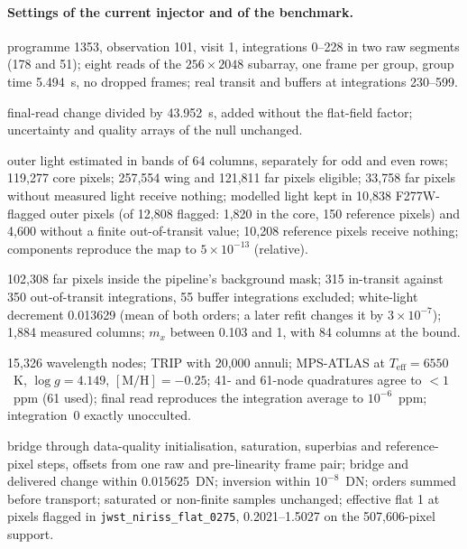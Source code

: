 \paragraph{Settings of the current injector and of the benchmark.}\label{tab:injector-settings}
{\footnotesize
\begin{description}[font=\normalfont\itshape,leftmargin=0pt,itemsep=0pt,topsep=2pt]
  \item[Baseline.] programme 1353, observation 101, visit 1, integrations 0--228 in two raw segments (178 and 51); eight reads of the $256\times2048$ subarray, one frame per group, group time 5.494~s, no dropped frames; real transit and buffers at integrations 230--599.
  \item[Rate-level control.] final-read change divided by 43.952~s, added without the flat-field factor; uncertainty and quality arrays of the null unchanged.
  \item[Source zones.] outer light estimated in bands of 64 columns, separately for odd and even rows; 119{,}277 core pixels; 257{,}554 wing and 121{,}811 far pixels eligible; 33{,}758 far pixels without measured light receive nothing; modelled light kept in 10{,}838 F277W-flagged outer pixels (of 12{,}808 flagged: 1{,}820 in the core, 150 reference pixels) and 4{,}600 without a finite out-of-transit value; 10{,}208 reference pixels receive nothing; components reproduce the map to $5\times10^{-13}$ (relative).
  \item[Measured far light.] 102{,}308 far pixels inside the pipeline's background mask; 315 in-transit against 350 out-of-transit integrations, 55 buffer integrations excluded; white-light decrement 0.013629 (mean of both orders; a later refit changes it by $3\times10^{-7}$); 1{,}884 measured columns; $m_x$ between 0.103 and 1, with 84 columns at the bound.
  \item[Transit tables.] 15{,}326 wavelength nodes; TRIP with 20{,}000 annuli; MPS-ATLAS at $T_{\mathrm{eff}}=6550$~K, $\log g=4.149$, $[\mathrm{M}/\mathrm{H}]=-0.25$; 41- and 61-node quadratures agree to $<1$~ppm (61 used); final read reproduces the integration average to $10^{-6}$~ppm; integration~0 exactly unocculted.
  \item[Transport.] bridge through data-quality initialisation, saturation, superbias and reference-pixel steps, offsets from one raw and pre-linearity frame pair; bridge and delivered change within 0.015625~DN; inversion within $10^{-8}$~DN; orders summed before transport; saturated or non-finite samples unchanged; effective flat 1 at pixels flagged in \texttt{jwst\_niriss\_flat\_0275}, 0.2021--1.5027 on the 507{,}606-pixel support.

\end{description}}
